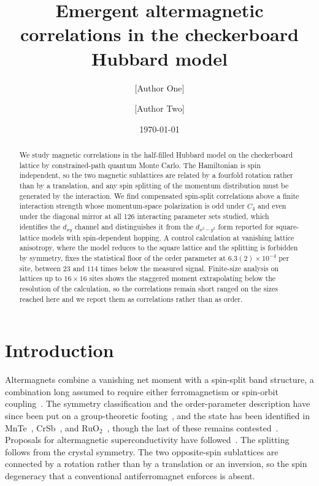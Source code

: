 \documentclass[aps,prb,reprint,superscriptaddress,amsmath,amssymb,floatfix]{revtex4-2}
\begin{document}
\title{Emergent altermagnetic correlations in the checkerboard Hubbard model}

\author{[Author One]}
\affiliation{[Affiliation]}
\author{[Author Two]}
\affiliation{[Affiliation]}

\date{\today}

\begin{abstract}
We study magnetic correlations in the half-filled Hubbard model on the
checkerboard lattice by constrained-path quantum Monte Carlo. The Hamiltonian is
spin independent, so the two magnetic sublattices are related by a fourfold
rotation rather than by a translation, and any spin splitting of the momentum
distribution must be generated by the interaction. We find compensated
spin-split correlations above a finite interaction strength whose momentum-space
polarization is odd under $C_4$ and even under the diagonal mirror at all 126
interacting parameter sets studied, which identifies the $d_{xy}$ channel and
distinguishes it from the $d_{x^2-y^2}$ form reported for square-lattice models
with spin-dependent hopping. A control calculation at vanishing lattice
anisotropy, where the model reduces to the square lattice and the splitting is
forbidden by symmetry, fixes the statistical floor of the order parameter at
$6.3(2)\times10^{-4}$ per site, between $23$ and $114$ times below the measured
signal. Finite-size analysis on lattices up to $16\times16$ sites shows the
staggered moment extrapolating below the resolution of the calculation, so the
correlations remain short ranged on the sizes reached here and we report them as
correlations rather than as order.
\end{abstract}

\maketitle

\section{Introduction}

Altermagnets combine a vanishing net moment with a spin-split band structure, a
combination long assumed to require either ferromagnetism or spin-orbit
coupling~\cite{Smejkal2022a,Smejkal2022b,SmejkalCrystal,Mazin2021}. The symmetry
classification and the order-parameter description have since been put on a
group-theoretic footing~\cite{McClarty2024,Bhowal2024,Roig2024}, and the state has
been identified in MnTe~\cite{Krempasky2024,Lee2024,Hariki2025},
CrSb~\cite{Reimers2024}, and RuO$_2$~\cite{Feng2022,Fedchenko2024}, though the last
of these remains contested~\cite{Bai2024}. Proposals for altermagnetic
superconductivity have followed~\cite{Brekke2023,Ouassou2023,Zhu2023,Chakraborty2024}.
The splitting follows from the crystal
symmetry. The two opposite-spin sublattices are connected by a rotation rather
than by a translation or an inversion, so the spin degeneracy that a conventional
antiferromagnet enforces is absent.
\end{document}
